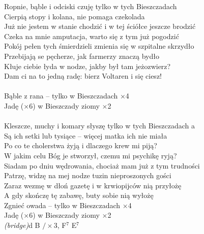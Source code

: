 \documentclass[a5paper, 10pt]{book}
\begin{document}
\begin{minipage}[t]{1\textwidth}
Ropnie, bąble i odciski czuję tylko w tych Bieszczadach\\
Cierpią stopy i kolana, nie pomaga czekolada\\
Już nie jestem w stanie chodzić i w tej ściółce jeszcze brodzić\\
Czeka na mnie amputacja, warto się z tym już pogodzić\\
\hspace*{3mm}Pokój pełen tych śmierdzieli zmienia się w szpitalne skrzydło\\
\hspace*{3mm}Przebijają se pęcherze, jak farmerzy znaczą bydło\\
\hspace*{3mm}Kłuje ciebie łyda w nodze, jakby był tam jeżozwierz?\\
\hspace*{3mm}Dam ci na to jedną radę: bierz Voltaren i się ciesz!\\
\\
\hspace*{10mm}Bąble z rana – tylko w Bieszczadach $\times$4\\
\hspace*{10mm}Jadę ($\times$6) w Bieszczady ziomy $\times$2\\
\\
Kleszcze, muchy i komary słyszę tylko w tych Bieszczadach a\\
Są ich setki lub tysiące – więcej matka ich nie miała\\
Po co te cholerstwa żyją i dlaczego krew mi piją?\\
W jakim celu Bóg je stworzył, czemu mi psychikę ryją?\\
\hspace*{3mm}Siadam po dniu wędrowania, chociaż mam już z tym trudności\\
\hspace*{3mm}Patrzę, widzę na mej nodze tuzin nieproszonych gości\\
\hspace*{3mm}Zaraz wezmę w dłoń gazetę i w krwiopijców nią przyłożę\\
\hspace*{3mm}A gdy skończę tę zabawę, buty sobie nią wyłożę\\

\hspace*{10mm}Zgnieć owada – tylko w Bieszczadach $\times$4\\
\hspace*{10mm}Jadę ($\times$6) w Bieszczady ziomy $\times$2\\

\textit{(bridge)}\hfill d B $/ \times$3, 
F$^7$ E$^7$\\
\end{minipage}
\end{document}
